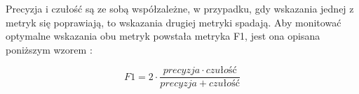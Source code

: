 Precyzja i czułość są ze sobą współzależne, w przypadku, gdy wskazania jednej z metryk się poprawiają, to wskazania drugiej metryki spadają. Aby monitować optymalne wskazania obu metryk powstała metryka F1, jest ona opisana poniższym wzorem \cite{metryki_2}:

$$
    F1 = 2 \cdot \frac{precyzja \cdot czułość}{precyzja + czułość}
$$








